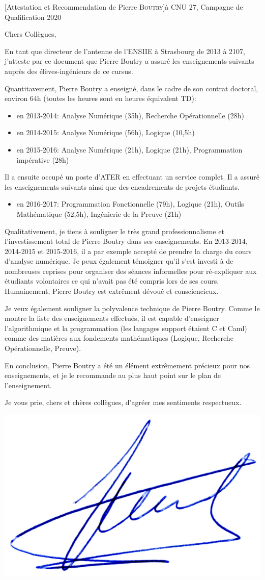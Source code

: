 \documentclass[a4paper,10pt]{article}
\begin{document}

\begin{letter}[Attestation et Recommendation de Pierre \textsc{Boutry}]{à}%
{CNU 27, Campagne de Qualification 2020}

Chers Collègues,

En tant que directeur de l'antenne de l'ENSIIE à Strasbourg de 2013 à 2107,
j'atteste par ce document que Pierre Boutry a assuré les enseignements suivants
auprès des élèves-ingénieurs de ce cursus.

\noindent 
Quantitavement, Pierre Boutry a enseigné, dans le cadre de son contrat doctoral, environ 64h (toutes les heures
sont en heures équivalent TD):
\begin{itemize}
	  \item  en 2013-2014: Analyse Numérique (35h), Recherche Opérationnelle (28h)
	  \item  en 2014-2015: Analyse Numérique (56h), Logique (10,5h)
	  \item  en 2015-2016:  Analyse Numérique (21h), Logique (21h), Programmation impérative (28h)
\end{itemize}

\smallskip

\noindent Il a ensuite occupé un poste d'ATER en effectuant un service complet. Il a assuré les
enseignements suivants ainsi que des encadrements de projets étudiants.
\begin{itemize}
	  \item  en 2016-2017:  Programmation Fonctionnelle (79h), Logique (21h), 
		    Outils Mathématique (52,5h), Ingénierie de la Preuve (21h)
\end{itemize}

\bigskip

\noindent Qualitativement, je tiens à souligner le très grand professionnalisme et l'investissement total
de Pierre Boutry dans ses enseignements. 
%
En 2013-2014, 2014-2015 et 2015-2016, il a par exemple accepté de prendre la charge du 
cours d'analyse numérique. Je peux également témoigner qu'il s'est investi à de nombreuses
reprises pour organiser des séances informelles pour ré-expliquer aux étudiants volontaires
ce qui n'avait pas été compris lors de ses cours. Humainement, Pierre Boutry est 
extrêment dévoué et consciencieux.

Je veux également souligner la polyvalence technique de Pierre Boutry.
Comme le montre la liste des enseignements effectués, il est capable d'enseigner l'algorithmique
et la programmation (les langages support étaient C et Caml) comme des matières aux
fondements mathématiques (Logique, Recherche Opérationnelle, Preuve). 

En conclusion, Pierre Boutry a été un élément extrêmement précieux pour nos enseignements,
et je le recommande au plus haut point sur le plan de l'enseignement.

Je vous prie, chers et chères collègues, d'agréer mes sentiments respectueux.
\end{letter}
\begin{flushright}
\includegraphics[width=.2\textwidth]{signgenaud.jpg}
\end{flushright}
\end{document}
